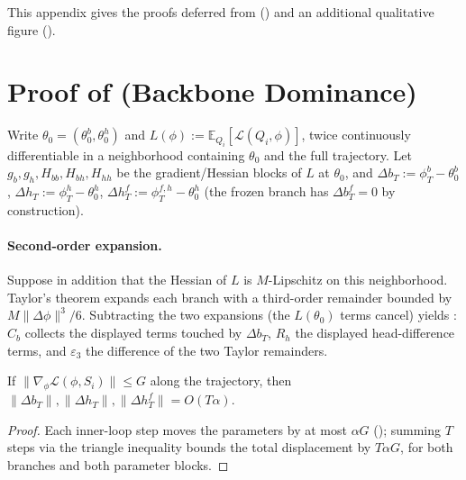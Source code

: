 This appendix gives the proofs deferred from  () and an additional qualitative figure ().

\section{Proof of  (Backbone Dominance)}
\label{app:taylor}

Write $\theta_0=(\theta_0^b,\theta_0^h)$ and $L(\phi):=\mathbb{E}_{Q_i}[\mathcal{L}(Q_i,\phi)]$, twice continuously differentiable in a neighborhood containing $\theta_0$ and the full trajectory. Let $g_b,g_h,H_{bb},H_{bh},H_{hh}$ be the gradient/Hessian blocks of $L$ at $\theta_0$, and $\Delta b_T:=\phi_T^b-\theta_0^b$, $\Delta h_T:=\phi_T^h-\theta_0^h$, $\Delta h_T^f:=\phi_T^{f,h}-\theta_0^h$ (the frozen branch has $\Delta b_T^f=0$ by construction).

\paragraph{Second-order expansion.} Suppose in addition that the Hessian of $L$ is $M$-Lipschitz on this neighborhood. Taylor's theorem expands each branch with a third-order remainder bounded by $M\|\Delta\phi\|^3/6$. Subtracting the two expansions (the $L(\theta_0)$ terms cancel) yields : $C_b$ collects the displayed terms touched by $\Delta b_T$, $R_h$ the displayed head-difference terms, and $\varepsilon_3$ the difference of the two Taylor remainders.

\begin{lemma}
\label{lem:displacement}
If $\|\nabla_\phi\mathcal{L}(\phi,S_i)\|\le G$ along the trajectory, then $\|\Delta b_T\|,\|\Delta h_T\|,\|\Delta h_T^f\|=O(T\alpha)$.
\end{lemma}
\begin{proof}
Each inner-loop step moves the parameters by at most $\alpha G$ (); summing $T$ steps via the triangle inequality bounds the total displacement by $T\alpha G$, for both branches and both parameter blocks.
\end{proof}

